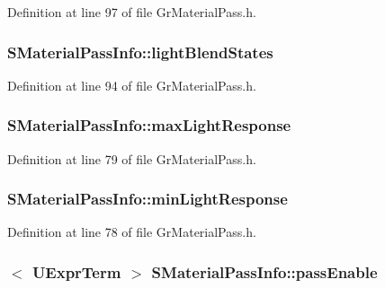 Definition at line 97 of file GrMaterialPass.h.\hypertarget{struct_s_material_pass_info_1bb1369eafd762e7b2adc9b456fae885}{
\subsubsection[{lightBlendStates}]{ {\bf SMaterialPassInfo::lightBlendStates}}}
\label{struct_s_material_pass_info_1bb1369eafd762e7b2adc9b456fae885}




Definition at line 94 of file GrMaterialPass.h.\hypertarget{struct_s_material_pass_info_5ee16644b6f677c6eae42bf410a43dfd}{
\subsubsection[{maxLightResponse}]{ {\bf SMaterialPassInfo::maxLightResponse}}}
\label{struct_s_material_pass_info_5ee16644b6f677c6eae42bf410a43dfd}




Definition at line 79 of file GrMaterialPass.h.\hypertarget{struct_s_material_pass_info_ac97ff420977ef457316e478e8827cda}{
\subsubsection[{minLightResponse}]{ {\bf SMaterialPassInfo::minLightResponse}}}
\label{struct_s_material_pass_info_ac97ff420977ef457316e478e8827cda}




Definition at line 78 of file GrMaterialPass.h.\hypertarget{struct_s_material_pass_info_47066b32f4d65c956ec8789a7ec14fb2}{
\subsubsection[{passEnable}]{$<$ {\bf UExprTerm} $>$ {\bf SMaterialPassInfo::passEnable}}}
\label{struct_s_material_pass_info_47066b32f4d65c956ec8789a7ec14fb2}





